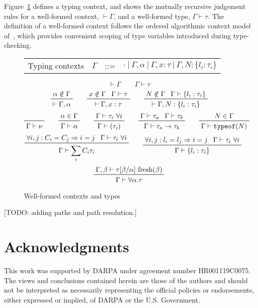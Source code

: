 \documentclass[letterpaper]{article}
\newcommand{\todo}[1]{{\color{red}[TODO: #1]}}
\begin{document}
Figure~\ref{f:ctxt} defines a typing context, and shows the mutually
recursive judgement rules for a well-formed context, $\vdash\Gamma$,
and a well-formed type, $\Gamma\vdash\tau$.  The definition of a
well-formed context follows the ordered algorithmic context model
of~\cite{zhao2018,zhao19:bidir,Dunfield13:bidir}, which provides
convenient scoping of type variables introduced during type-checking.

\begin{figure}
    \begin{tabular}{l c l l}
    Typing contexts        & $\Gamma$      & ::= & $\cdot\ |\ \Gamma, \alpha\ |\ \Gamma, x: \tau\ |\ \Gamma, N: \{l_i:\tau_i\}$ \\
  \end{tabular}

  $$ \boxed{\vdash\Gamma} \qquad \boxed{\Gamma\vdash\tau} $$
  $$ \prftree{\prfassumption{\alpha\notin\Gamma}}
             {\vdash\Gamma, \alpha}\qquad
     \prftree{\prfassumption{x\notin\Gamma}}{\prfassumption{\Gamma\vdash\tau}}
             {\vdash\Gamma, x:\tau}\qquad
     \prftree{\prfassumption{N\notin\Gamma}}{\prfassumption{\Gamma\vdash\{l_i:\tau_i\}}}
             {\vdash\Gamma, N:\{l_i:\tau_i\}} $$
  $$ \prfaxiom{\Gamma\vdash\nu}\qquad
     \prftree{\prfassumption{\alpha\in\Gamma}}
             {\Gamma\vdash\alpha}\qquad
     \prftree{\prfassumption{\Gamma\vdash\tau_i\ \forall i}}
             {\Gamma\vdash(\tau_i)}\qquad
     \prftree{\prfassumption{\Gamma\vdash\tau_a}}{\prfassumption{\Gamma\vdash\tau_b}}
             {\Gamma\vdash\tau_a\rightarrow\tau_b}\qquad
     \prftree{\prfassumption{N\in\Gamma}}
             {\Gamma\vdash\texttt{typeof}(N)} $$
  $$ \prftree{\prfassumption{\forall i,j:C_i=C_j\Rightarrow i=j}}
             {\prfassumption{\Gamma\vdash\tau_i\ \forall i}}
             {\Gamma\vdash\sum_i C_i\tau_i}\qquad
     \prftree{\prfassumption{\forall i,j:l_i=l_j\Rightarrow i=j}}
             {\prfassumption{\Gamma\vdash\tau_i\ \forall i}}
             {\Gamma\vdash\{l_i:\tau_i\}} $$
  $$ \prftree{\prfassumption{\Gamma,\beta\vdash\tau[\beta/\alpha]\ \textrm{fresh}(\beta) }}
             {\Gamma\vdash\forall\alpha.\tau} $$
  \caption{Well-formed contexts and types}
  \label{f:ctxt}
\end{figure}

\todo{adding paths and path resolution.}

\section*{Acknowledgments}
This work was supported by DARPA under agreement number HR001119C0075.
The views and conclusions contained herein are those of the authors
and should not be interpreted as necessarily representing the official
policies or endorsements, either expressed or implied, of DARPA or the
U.S. Government.



\end{document}
